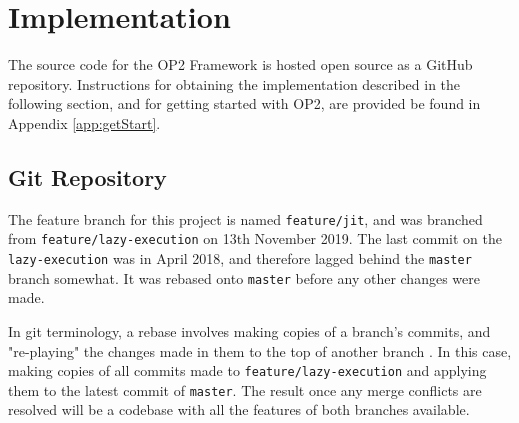 
\section{Implementation}
\label{s:impl}
The source code for the OP2 Framework is hosted open source as a GitHub\cite{OP2rep} repository. Instructions for obtaining the implementation described in the following section, and for getting started with OP2, are provided be found in Appendix \ref{app:getStart}.
\subsection{Git Repository}
The feature branch for this project is named \verb|feature/jit|, and was branched from \verb|feature/lazy-execution| on 13th November 2019. The last commit on the \verb|lazy-execution| was in April 2018, and therefore lagged behind the \verb|master| branch somewhat. It was rebased onto \verb|master| before any other changes were made.
\par
In git terminology, a rebase involves making copies of a branch's commits, and "re-playing" the changes made in them to the top of another branch \cite{scm-rebase}. In this case, making copies of all commits made to \verb|feature/lazy-execution| and applying them to the latest commit of \verb|master|. The result once any merge conflicts are resolved will be a codebase with all the features of both branches available.
